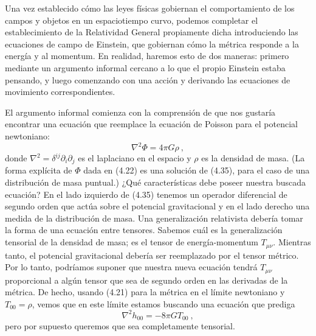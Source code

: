 \documentclass[11pt,b5paper,openany,twoside]{book}
\newcommand{\mn}{{\mu\nu}}
\newcommand{\p}[1]{{\partial_{#1}}}
\begin{document}
Una vez establecido cómo las leyes físicas gobiernan el comportamiento de los campos y objetos en un espaciotiempo curvo, podemos completar el establecimiento de la Relatividad General propiamente dicha introduciendo las ecuaciones de campo de Einstein, que gobiernan cómo la métrica responde a la energía y al momentum.
En realidad, haremos esto de dos maneras: primero mediante un argumento informal cercano a lo que el propio Einstein estaba pensando, y luego comenzando con una acción y derivando las ecuaciones de movimiento correspondientes.

El argumento informal comienza con la comprensión de que nos gustaría encontrar una ecuación que reemplace la ecuación de Poisson para el potencial newtoniano:
\begin{equation}
\nabla^2\Phi = 4\pi G\rho\ ,\label{4.35}
\end{equation}
donde $\nabla^2 = \delta^{ij}\p{i}\p{j}$ es el laplaciano en el espacio y $\rho$ es la densidad de masa.
(La forma explícita de $\Phi$ dada en (4.22) es una solución de (4.35), para el caso de una distribución de masa puntual.)
¿Qué características debe poseer nuestra buscada ecuación? En el lado izquierdo de (4.35) tenemos un operador diferencial de segundo orden que actúa sobre el potencial gravitacional y en el lado derecho una medida de la distribución de masa.
Una generalización relativista debería tomar la forma de una ecuación entre tensores.
Sabemos cuál es la generalización tensorial de la densidad de masa; es el tensor de energía-momentum $T_\mn$.
Mientras tanto, el potencial gravitacional debería ser reemplazado por el tensor métrico.
Por lo tanto, podríamos suponer que nuestra nueva ecuación tendrá $T_\mn$ proporcional a algún tensor que sea de segundo orden en las derivadas de la métrica.
De hecho, usando (4.21) para la métrica en el límite newtoniano y $T_{00}=\rho$, vemos que en este límite estamos buscando una ecuación que prediga
\begin{equation}
\nabla^2 h_{00} = -8\pi G T_{00}\ ,\label{4.36}
\end{equation}
pero por supuesto queremos que sea completamente tensorial.
\end{document}
